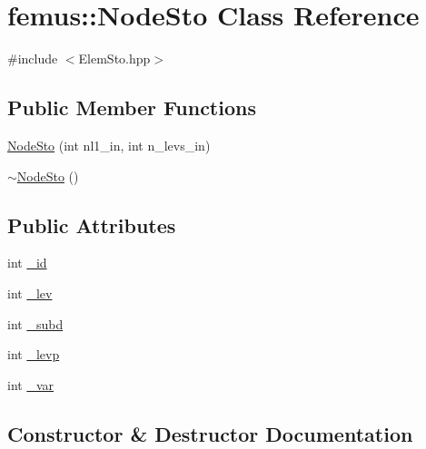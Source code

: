 \hypertarget{classfemus_1_1_node_sto}{}\section{femus\+:\+:Node\+Sto Class Reference}
\label{classfemus_1_1_node_sto}


{\ttfamily \#include $<$Elem\+Sto.\+hpp$>$}

\subsection*{Public Member Functions}
\begin{DoxyCompactItemize}
\item 
\mbox{\hyperlink{classfemus_1_1_node_sto_a4cddd926b3364e8e35809af171f37575}{Node\+Sto}} (int nl1\+\_\+in, int n\+\_\+levs\+\_\+in)
\item 
\mbox{\hyperlink{classfemus_1_1_node_sto_aec1e3bc42d578433e7fcc894039d1bbb}{$\sim$\+Node\+Sto}} ()
\end{DoxyCompactItemize}
\subsection*{Public Attributes}
\begin{DoxyCompactItemize}
\item 
int \mbox{\hyperlink{classfemus_1_1_node_sto_a73cb962aeb9c1ba7c58dffd10c3a5c72}{\+\_\+id}}
\item 
int \mbox{\hyperlink{classfemus_1_1_node_sto_aeae85ae14a0a2a278636046579b084c2}{\+\_\+lev}}
\item 
int \mbox{\hyperlink{classfemus_1_1_node_sto_a8d90125bc244fb501d8426d43c7c6d69}{\+\_\+subd}}
\item 
int \mbox{\hyperlink{classfemus_1_1_node_sto_a93d77191ef3021338e383cc7c8b1bc3b}{\+\_\+levp}}
\item 
int \mbox{\hyperlink{classfemus_1_1_node_sto_a35bd418878c1058f42bdd33d03271e6b}{\+\_\+var}}
\end{DoxyCompactItemize}


\subsection{Constructor \& Destructor Documentation}
\mbox{\label{classfemus_1_1_node_sto_a4cddd926b3364e8e35809af171f37575}} 
